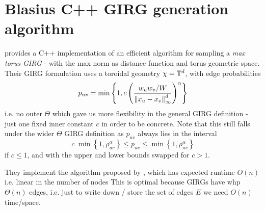 


\section{Blasius C++ GIRG generation algorithm}
\label{sec:blasius_cpp_generation}
\cite{blasius2022efficiently} provides a C++ implementation of an efficient algorithm for sampling a \textit{max torus GIRG} - with the max norm as distance function and torus geometric space.
Their GIRG formulation uses a toroidal geometry $\chi = \mathbb{T}^d$, with edge probabilities 
\begin{equation}
    p_{uv} = \min \left \{ 
        1,
        c \left (
            \frac{w_u w_v / W}{\left\lVert x_u - x_v\right\rVert_\infty^d}
        \right )^\alpha    
    \right \}
    \label{eq:blasius_GIRG_puv}
\end{equation}
i.e. no outer $\Theta$ which gave us more flexibility in the general GIRG definition - just one fixed inner constant $c$ in order to be concrete. 
Note that this still falls under the wider $\Theta$ GIRG definition 
as $p_{uv}$ always lies in the interval 
\begin{equation}
    c \; \min \left \{ 
        1,
        \rho_{uv}^\alpha
    \right \} \leq p_{uv} \leq \min \left \{ 
        1,
        \rho_{uv}^\alpha
    \right \}
\end{equation}
if $c \leq 1$, and with the upper and lower bounds swapped for $c > 1$.


They implement the algorithm proposed by \cite{bringmann2019geometric}, which has expected runtime $O(n)$ i.e. linear in the number of nodes
This is optimal because GIRGs have whp $\Theta(n)$ edges,
i.e. just to write down / store the set of edges $E$ we need $O(n)$ time/space.

